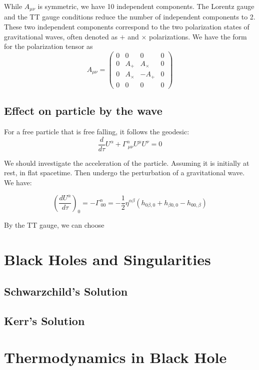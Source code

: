 \documentclass{article}
\begin{document}
While $A_{\mu\nu}$ is symmetric, we have 10 independent components. The Lorentz gauge and the TT gauge conditions reduce the number of independent components to 2. These two independent components correspond to the two polarization states of gravitational waves, often denoted as $+$ and $\times$ polarizations. We have the form for the polarization tensor as
\begin{equation}
    A_{\mu\nu} = \begin{pmatrix}
0 & 0 & 0 & 0 \\
0 & A_+ & A_\times & 0 \\
0 & A_\times & -A_+ & 0 \\
0 & 0 & 0 & 0
\end{pmatrix}
\end{equation}

\subsection{Effect on particle by the wave}

For a free particle that is free falling, it follows the geodesic:
\begin{equation}
    \frac{d}{d\tau}U^\alpha+\Gamma^\alpha_{~\mu\nu} U^\mu U^\nu = 0
\end{equation}

We should investigate the acceleration of the particle. Assuming it is initially at rest, in flat spacetime. Then undergo the perturbation of a gravitational wave. We have:

\begin{equation}
    \left(\frac{d U^\alpha}{d \tau}\right)_0 =  -\Gamma ^\alpha _{~00} = -\frac{1}{2}{ \eta^{\alpha\beta}}(h_{0\beta,0}+h_{\beta0,0}-h_{00,\beta})
\end{equation}

By the TT gauge, we can choose
\section{Black Holes and Singularities}
\subsection{Schwarzchild's Solution}
\subsection{Kerr's Solution}

\section{Thermodynamics in Black Hole}
\end{document}
